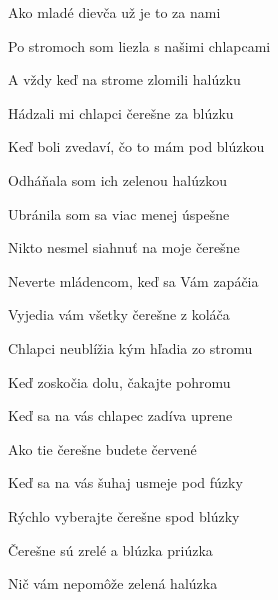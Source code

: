 \begin{song}


\begin{hchordbox}
\end{hchordbox}

\Large

\bigskip

 Ako mladé dievča  už je to  za nami \par
{} Po stromoch som liezla  s našimi  chlapcami \par
{}A vždy keď na strome zlomili halúzku \par
{}Hádzali mi chlapci čerešne za blúzku \par
{}Keď boli zvedaví, čo to mám pod blúzkou \par
{}Odháňala som ich zelenou halúzkou \par

\bigskip


\bigskip

 Ubránila som sa  viac menej  úspešne \par
{} Nikto nesmel siahnuť  na moje  čerešne \par
{}Neverte mládencom, keď sa Vám zapáčia \par
{}Vyjedia vám všetky čerešne z koláča \par
{}Chlapci neublížia kým hľadia zo stromu \par
{}Keď zoskočia dolu, čakajte pohromu \par

\bigskip


\bigskip

 Keď sa na vás chlapec  zadíva  uprene \par
{} Ako tie čerešne  budete  červené \par
{}Keď sa na vás šuhaj usmeje pod fúzky \par
{}Rýchlo vyberajte čerešne spod blúzky \par
{}Čerešne sú zrelé a blúzka priúzka \par
{}Nič vám nepomôže zelená halúzka \par

\end{song}